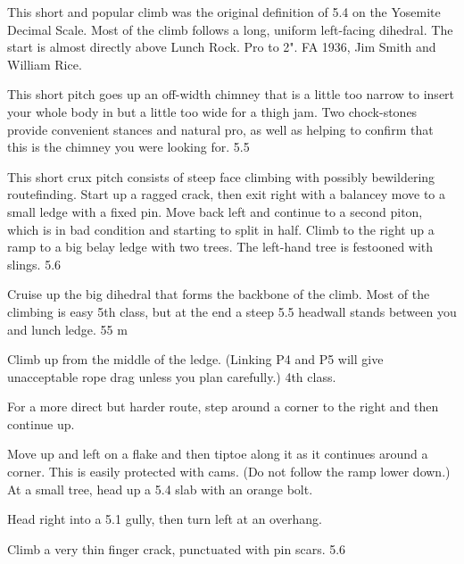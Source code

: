\documentclass{tahquitz}
\begin{document}
\tableofcontents

\vfill\pagebreak




This short and popular climb was the original definition of 5.4 on the Yosemite Decimal Scale.
Most of the climb follows a long, uniform left-facing dihedral.
The start is almost directly above Lunch Rock. Pro to 2". FA
1936, Jim Smith and William Rice.

 This short pitch goes up an off-width chimney that is a little too
narrow to insert your whole body in but a little too wide for a thigh jam.
Two chock-stones provide convenient stances and natural pro, as well as helping
to confirm that this is the chimney you were looking for. 5.5

 This short crux pitch consists of steep face climbing with
possibly bewildering routefinding. Start up a ragged crack, then
exit right with a balancey move to a small ledge with a fixed pin.
Move back left and continue to a second piton, which is in bad condition
and starting to split in half. Climb to the right up a ramp to a big belay
ledge with two trees. The left-hand tree is festooned with slings. 5.6

 Cruise up the big dihedral that forms the backbone of the climb.
Most of the climbing is easy 5th class, but at the end a steep 5.5 headwall
stands between you and lunch ledge. 55 m


 Climb up from the middle of the ledge. (Linking P4 and P5 will
give unacceptable rope drag unless you plan carefully.) 4th class.

 For a more direct but harder route, step around a corner
to the right and then continue up.

 Move up and left on a flake
and then tiptoe along it as it continues around a corner.
This is easily protected with cams. (Do not follow the ramp lower down.) At a small
tree, head up a 5.4 slab with an orange bolt.

 Head right into a 5.1 gully, then turn left at an overhang.

 Climb a very thin finger crack, punctuated with pin scars. 5.6
\end{document}
